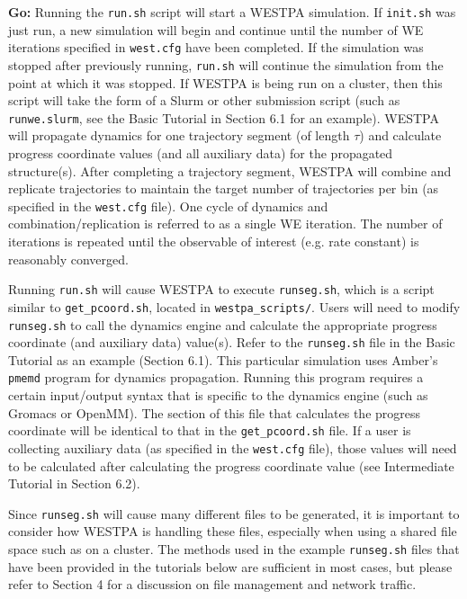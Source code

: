 \documentclass[9pt,tutorial]{livecoms}
\begin{document}
\textbf{Go:} Running the \verb|run.sh| script will start a WESTPA simulation. 
If \verb|init.sh| was just run, a new simulation will begin and continue until the number of WE iterations specified in \verb|west.cfg| have been completed. 
If the simulation was stopped after previously running, \verb|run.sh| will continue the simulation from the point at which it was stopped. 
If WESTPA is being run on a cluster, then this script will take the form of a Slurm or other submission script (such as \verb|runwe.slurm|, see the Basic Tutorial in Section 6.1 for an example). 
WESTPA will propagate dynamics for one trajectory segment (of length $\tau$) and calculate progress coordinate values (and all auxiliary data) for the propagated structure(s). 
After completing a trajectory segment, WESTPA will combine and replicate trajectories to maintain the target number of trajectories per bin (as specified in the \verb|west.cfg| file). 
One cycle of dynamics and combination/replication is referred to as a single WE iteration. 
The number of iterations is repeated until the observable of interest (e.g. rate constant) is reasonably converged.

Running \verb|run.sh| will cause WESTPA to execute \verb|runseg.sh|, which is a script similar to \verb|get_pcoord.sh|, located in \verb|westpa_scripts/|. 
Users will need to modify \verb|runseg.sh| to call the dynamics engine and calculate the appropriate progress coordinate (and auxiliary data) value(s). 
Refer to the \verb|runseg.sh| file in the Basic Tutorial as an example (Section 6.1). 
This particular simulation uses Amber’s \verb|pmemd| program for dynamics propagation. 
Running this program requires a certain input/output syntax that is specific to the dynamics engine (such as Gromacs or OpenMM). 
The section of this file that calculates the progress coordinate will be identical to that in the \verb|get_pcoord.sh| file. If a user is collecting auxiliary data (as specified in the \verb|west.cfg| file), those values will need to be calculated after calculating the progress coordinate value (see Intermediate Tutorial in Section 6.2).

Since \verb|runseg.sh| will cause many different files to be generated, it is important to consider how WESTPA is handling these files, especially when using a shared file space such as on a cluster. 
The methods used in the example \verb|runseg.sh| files that have been provided in the tutorials below are sufficient in most cases, but please refer to Section 4 for a discussion on file management and network traffic.
\end{document}
